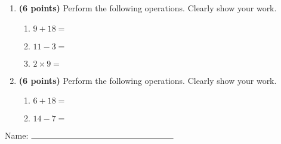 \documentclass[12pt]{amsart}
\begin{document}
\newpage
\begin{enumerate}
\item {\bf (6 points)} 
 Perform the following operations. Clearly show your work. \begin{enumerate}


\def \a{9}\def \b{18}\def \apb{27}

 
\item $\a + \b = $

\vspace{2cm}
\def \a{11}\def \dif{8}\def \b{3}

 
\item $\a - \b = $

\vspace{2cm}
\def \a{2}\def \b{9}\def \ab{11}

 
\item $\a \times \b = $ 

\vspace{2cm}
\def \vshift{-3}\def \hshift{-4}\def \chang{-2}\def \findval{-6}\def \yval{1}

 
\end{enumerate}


\newpage
\item {\bf (6 points)} 
 Perform the following operations. Clearly show your work. \begin{enumerate}


\def \a{6}\def \b{18}\def \apb{24}

 
\item $\a + \b = $

\vspace{2cm}
\def \a{14}\def \dif{7}\def \b{7}

 
\item $\a - \b = $

\vspace{2cm}
\def \vshift{5}\def \hshift{-2}\def \chang{-2}\def \findval{-4}\def \yval{9}

 
\end{enumerate}


\newpage\end{enumerate}\graphicspath{{/Users/jilan/Downloads/Randomizer/Randomizer/Sample Course/Sample Assessment 2/}}\setcounter{page}{1}


\thispagestyle{fancy}

 
\noindent Name: $\rule{6cm}{0.15mm}$

\vspace{.2cm}
\end{document}
